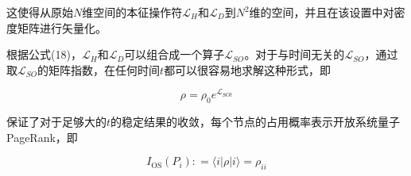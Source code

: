 这使得从原始$N$维空间的本征操作符$\mathcal { L } _ { H }$和$\mathcal { L } _ { D }$到$N^2$维的空间，并且在该设置中对密度矩阵进行矢量化。

根据公式(18)，$\mathcal { L } _ { H }$和$\mathcal { L } _ { D }$可以组合成一个算子$\mathcal { L } _ { SO }$。对于与时间无关的$\mathcal { L } _ { SO }$，通过取$\mathcal { L } _ { SO }$的矩阵指数，在任何时间$t$都可以很容易地求解这种形式，即

\begin{equation}
	\rho = \rho _ { 0 } e ^ { \mathcal { L } _ { S O t } }
\end{equation}

保证了对于足够大的$t$的稳定结果的收敛，每个节点的占用概率表示开放系统量子PageRank，即

\begin{equation}
	I _ { \mathrm { OS } } \left( P _ { i } \right) : = \langle i | \rho | i \rangle = \rho _ { i i }
\end{equation}